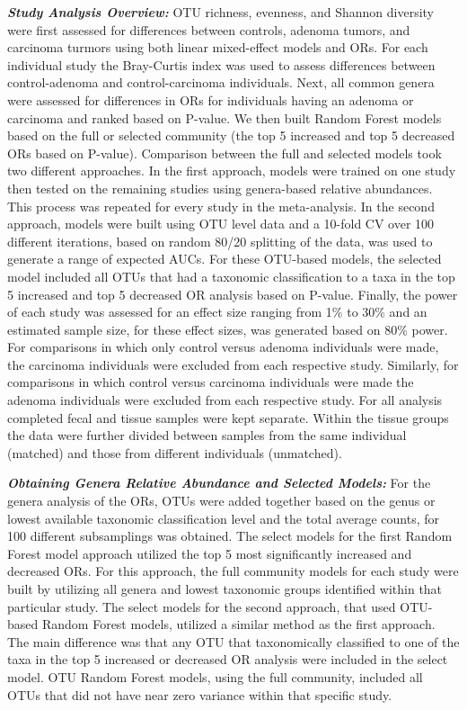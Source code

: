 \documentclass[12pt,]{article}
\begin{document}
\textbf{\emph{Study Analysis Overview:}} OTU richness, evenness, and
Shannon diversity were first assessed for differences between controls,
adenoma tumors, and carcinoma turmors using both linear mixed-effect
models and ORs. For each individual study the Bray-Curtis index was used
to assess differences between control-adenoma and control-carcinoma
individuals. Next, all common genera were assessed for differences in
ORs for individuals having an adenoma or carcinoma and ranked based on
P-value. We then built Random Forest models based on the full or
selected community (the top 5 increased and top 5 decreased ORs based on
P-value). Comparison between the full and selected models took two
different approaches. In the first approach, models were trained on one
study then tested on the remaining studies using genera-based relative
abundances. This process was repeated for every study in the
meta-analysis. In the second approach, models were built using OTU level
data and a 10-fold CV over 100 different iterations, based on random
80/20 splitting of the data, was used to generate a range of expected
AUCs. For these OTU-based models, the selected model included all OTUs
that had a taxonomic classification to a taxa in the top 5 increased and
top 5 decreased OR analysis based on P-value. Finally, the power of each
study was assessed for an effect size ranging from 1\% to 30\% and an
estimated sample size, for these effect sizes, was generated based on
80\% power. For comparisons in which only control versus adenoma
individuals were made, the carcinoma individuals were excluded from each
respective study. Similarly, for comparisons in which control versus
carcinoma individuals were made the adenoma individuals were excluded
from each respective study. For all analysis completed fecal and tissue
samples were kept separate. Within the tissue groups the data were
further divided between samples from the same individual (matched) and
those from different individuals (unmatched).

\textbf{\emph{Obtaining Genera Relative Abundance and Selected Models:}}
For the genera analysis of the ORs, OTUs were added together based on
the genus or lowest available taxonomic classification level and the
total average counts, for 100 different subsamplings was obtained. The
select models for the first Random Forest model approach utilized the
top 5 most significantly increased and decreased ORs. For this approach,
the full community models for each study were built by utilizing all
genera and lowest taxonomic groups identified within that particular
study. The select models for the second approach, that used OTU-based
Random Forest models, utilized a similar method as the first approach.
The main difference was that any OTU that taxonomically classified to
one of the taxa in the top 5 increased or decreased OR analysis were
included in the select model. OTU Random Forest models, using the full
community, included all OTUs that did not have near zero variance within
that specific study.
\end{document}
